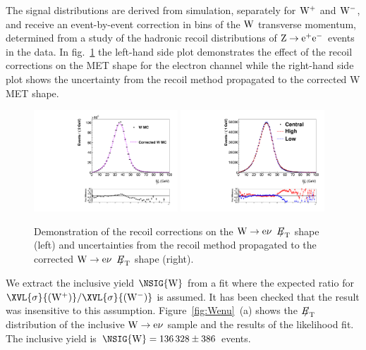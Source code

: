 The signal distributions are derived from simulation,
separately for $\mathrm{W^+}$ and $\mathrm{W^-}$, and receive
an event-by-event correction in bins of the $\mathrm{W}$ transverse momentum,
determined from a study of the hadronic recoil
distributions of $\mathrm{Z} \rightarrow \mathrm{e}^+\mathrm{e}^-$ events in the data.%
In fig.~\ref{fig:Recoil} the left-hand side plot demonstrates the effect of the recoil
corrections on the MET shape for the electron channel while the right-hand side plot
shows the uncertainty from the recoil method propagated to the corrected W MET shape.


\begin{figure}
\begin{center}
\includegraphics[width=0.48\textwidth]{figs/beforeANDafter.pdf}
\includegraphics[width=0.48\textwidth]{figs/upANDdown.pdf}
\caption{ \label{fig:Recoil}
Demonstration of the recoil corrections on the $\mathrm{W} \rightarrow \mathrm{e}\nu$ ${E\!\!\!/}_{\mathrm{T}}$ shape (left)
and uncertainties from the recoil method propagated to the corrected
$\mathrm{W} \rightarrow \mathrm{e}\nu$ ${E\!\!\!/}_{\mathrm{T}}$ shape (right).
}
\end{center}
\end{figure}



We extract the inclusive yield $\NSIG{\Wo}$ from a fit where
the expected ratio for $\XVL{\sigma}{(\Wp)}/\XVL{\sigma}{(\Wm)}$
is assumed.
It has been  checked that the result was insensitive to this assumption.
Figure~\ref{fig:Wenu}~(a) shows the ${E\!\!\!/}_{\mathrm{T}}$ distribution of
the inclusive $\mathrm{W} \rightarrow \mathrm{e}\nu$ sample
and the results of the likelihood fit.
The inclusive yield is $\NSIG{\Wo} = \WEIYIELD$ events.

